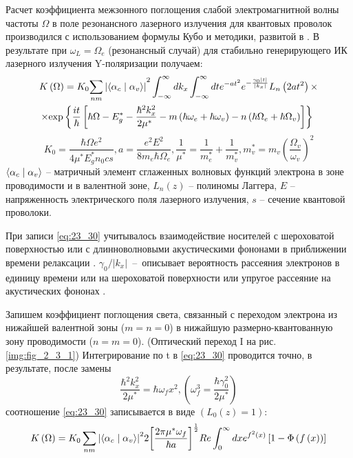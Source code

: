 Расчет коэффициента межзонного поглощения слабой электромагнитной волны частоты $\Omega$ в поле резонансного лазерного излучения для квантовых проволок производился с использованием формулы Кубо \cite{Kubo1957a} и методики, развитой в \cite{Sinyavskii1974}. В результате при ${\omega }_L=\Omega_e$ (резонансный случай) для стабильно генерирующего ИК лазерного излучения Y-поляризации получаем:
\begin{multline} \label{eq:23_30}
K\left(\Omega\right)=K_0{\sum_{nm}{\left|\left\langle {\alpha }_c\mathrel{\left|\vphantom{{\alpha }_c {\alpha }_v}\right.\kern-\nulldelimiterspace}{\alpha }_v\right\rangle \right|}}^2\int^{\infty }_{-\infty }{dk_x}\int^{\infty }_{-\infty }{dt}e^{-at^2}e^{-\frac{{\gamma }_0\left|t\right|}{\left|k_x\right|}}L_n\left(2at^2\right)\times\\
\times {\exp \left\{\frac{it}{\hbar }\left[\hbar \Omega-E^*_g-\frac{{\hbar }^2k^2_x}{2{\mu }^*\ }-m\left(\hbar {\omega }_e+\hbar {\omega }_v\right)-n\left(\hbar \Omega_e+\hbar \Omega_v\right)\right]\right\}\ }
\end{multline}
\[
K_0=\frac{\hbar \Omega e^2}{4{\mu }^*E^*_gn_0cs}, 
a=\frac{e^2E^2}{8m_e\hbar \Omega_e}, \frac{1}{{\mu }^*}=\frac{1}{m^*_e}+\frac{1}{m^*_v}, m^*_v=m_v{\left(\frac{\Omega_v}{{\omega }_v}\right)}^2
\] 
$\left\langle {\alpha }_c\mathrel{\left|\vphantom{{\alpha }_c {\alpha }_v}\right.\kern-\nulldelimiterspace}{\alpha }_v\right\rangle $ -- матричный элемент сглаженных волновых функций электрона в зоне проводимости и в валентной зоне, $L_n\left(z\right)$ -- полиномы Лаггера, $E$ -- напряженность электрического поля лазерного излучения, $s$ -- сечение квантовой проволоки. 

При записи \eqref{eq:23_30} учитывалось взаимодействие носителей с шероховатой поверхностью или с длинноволновыми акустическими фононами в приближении времени релаксации \cite{Khamidullin2002}. ${{\gamma }_0}/{\left|k_x\right|}$~--~описывает вероятность рассеяния электронов в единицу времени или на шероховатой поверхности \cite{Karapetyan2012} или упругое рассеяние на акустических фононах \cite{Khamidullin2006}.

Запишем коэффициент поглощения света, связанный с переходом электрона из нижайшей валентной зоны ($m=n=0$) в нижайшую размерно-квантованную зону проводимости ($n=m=0$). (Оптический переход I на рис. \ref{img:fig_2_3_1}) Интегрирование по t в  \eqref{eq:23_30} проводится точно, в результате, после замены
\[
\frac{{\hbar }^2k^2_x}{2{\mu }^*}=\hbar {\omega }_fx^2, \left({\omega }^3_f=\frac{\hbar {\gamma }^2_0}{2{\mu }^*}\right)
\] 
соотношение  \eqref{eq:23_30} записывается в виде $\left(L_0\left(z\right)=1\right)$:
\begin{equation} \label{eq:23_40}
K\left(\Omega\right)=K_0\sum_{nm}{{\left|\left\langle {\alpha }_c\mathrel{\left|\vphantom{{\alpha }_c {\alpha }_v}\right.\kern-\nulldelimiterspace}{\alpha }_v\right\rangle \right|}^2}2{\left[\frac{2\pi {\mu }^*{\omega }_f}{\hbar a}\right]}^{\frac{1}{2}}Re\int^{\infty }_0{dx}e^{f^2\left(x\right)}\left[1-\Phi \left(f\left(x\right)\right)\right]
\end{equation}

